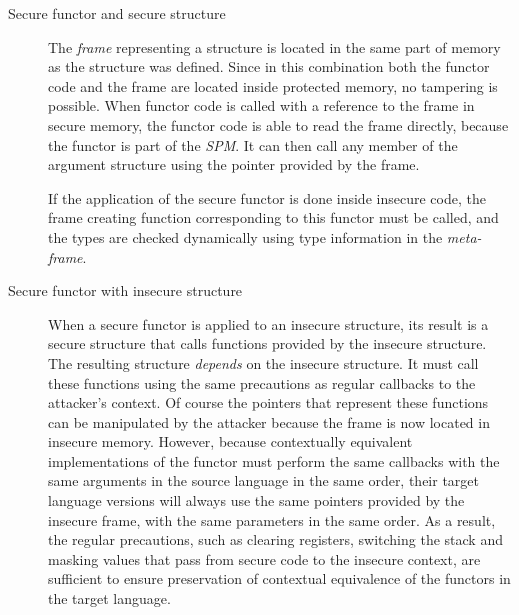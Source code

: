 \begin{description}
\item[Secure functor and secure structure] 
The \emph{frame} representing a structure is located in the same part of memory as the structure was defined.
Since in this combination both the functor code and the frame are located inside protected memory, no tampering is possible.
When functor code is called with a reference to the frame in secure memory, the functor code is able to read the frame directly, because the functor is part of the \emph{SPM}. It can then call any member of the argument structure using the pointer provided by the frame.

If the application of the secure functor is done inside insecure code, the frame creating function corresponding to this functor must be called, and the types are checked dynamically using type information in the \emph{meta-frame}.
\item[Secure functor with insecure structure]
When a secure functor is applied to an insecure structure, its result is a secure structure that calls functions provided by the insecure structure.
The resulting structure \emph{depends} on the insecure structure.
It must call these functions using the same precautions as regular callbacks to the attacker's context.
Of course the pointers that represent these functions can be manipulated by the attacker because the frame is now located in insecure memory.
However, because contextually equivalent implementations of the functor must perform the same callbacks with the same arguments in the source language in the same order, their target language versions will always use the same pointers provided by the insecure frame, with the same parameters in the same order.
As a result, the regular precautions, such as clearing registers, switching the stack and masking values that pass from secure code to the insecure context, are sufficient to ensure preservation of contextual equivalence of the functors in the target language.


\end{description}
